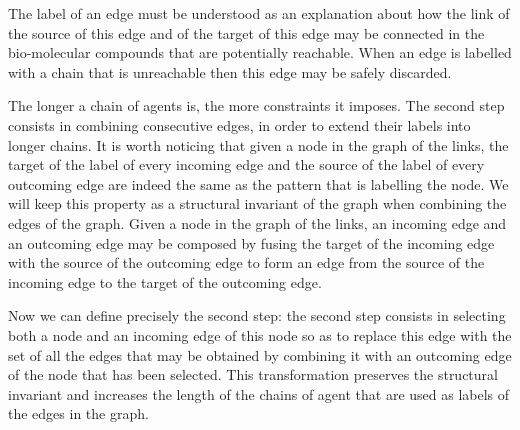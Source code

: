 \documentclass{entcs}
\begin{document}
The label of an edge must be understood as an explanation about how the link of the source of this edge and of the target of this edge may be connected in the bio-molecular compounds that are potentially reachable. When an edge is labelled with a chain that is unreachable then this edge may be safely discarded.

The longer a chain of agents is, the more constraints it imposes. The second step consists in combining consecutive edges, in order to extend their labels into longer chains. It is worth noticing that given a node in the graph of the links, the target of the label of every incoming edge and the source of the label of every outcoming edge are indeed the same as the pattern that is labelling the node.
We will keep this property as a structural invariant of the graph when combining the edges of the graph. Given a node in the graph of the links, an incoming edge and an outcoming edge may be composed by fusing the target of the incoming edge with the source of the outcoming edge to form an edge from the source of the incoming edge to the target of the outcoming edge.

Now we can define precisely the second step: the second step consists in
selecting both a node and an incoming edge of this node so as to replace this edge with the set of all the edges that may be obtained by combining it with an outcoming edge of the node that has been selected. This transformation preserves the structural invariant and increases the length of the chains of agent that are used as labels of the edges in the graph.
\end{document}
